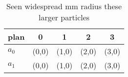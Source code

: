 \documentclass[a4paper]{article}
\begin{document}
\begin{table}
\begin{adjustbox}{width=0.7\columnwidth}
\begin{tabular}{|l|l|l|l|l|}
\hline
\textbf{plan} & \multicolumn{1}{c|}{\textbf{0}} & \multicolumn{1}{c|}{\textbf{1}} & \multicolumn{1}{c|}{\textbf{2}} & \multicolumn{1}{c|}{\textbf{3}} \\ \hline
\textbf{$a_0$}  & (0,0) & (1,0) & (2,0) & (3,0) \\ \hline
\textbf{$a_1$}  & (0,0) & (1,0) & (2,0) & (3,0) \\ \hline
\end{tabular}
\end{adjustbox}
\caption{Seen widespread mm radius these larger particles 
}
\end{table}
\end{document}
